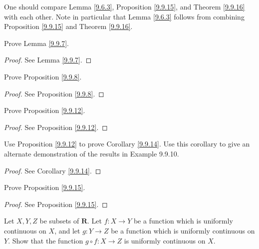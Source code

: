 \begin{remark}\label{9.9.17}
    One should compare Lemma \ref{9.6.3}, Proposition \ref{9.9.15}, and Theorem \ref{9.9.16} with each other.
    Note in particular that Lemma \ref{9.6.3} follows from combining Proposition \ref{9.9.15} and Theorem \ref{9.9.16}.
\end{remark}

\exercisesection

\begin{exercise}\label{ex 9.9.1}
    Prove Lemma \ref{9.9.7}.
\end{exercise}

\begin{proof}
    See Lemma \ref{9.9.7}.
\end{proof}

\begin{exercise}\label{ex 9.9.2}
    Prove Proposition \ref{9.9.8}.
\end{exercise}

\begin{proof}
    See Proposition \ref{9.9.8}.
\end{proof}

\begin{exercise}\label{ex 9.9.3}
    Prove Proposition \ref{9.9.12}.
\end{exercise}

\begin{proof}
    See Proposition \ref{9.9.12}.
\end{proof}

\begin{exercise}\label{ex 9.9.4}
    Use Proposition \ref{9.9.12} to prove Corollary \ref{9.9.14}.
    Use this corollary to give an alternate demonstration of the results in Example 9.9.10.
\end{exercise}

\begin{proof}
    See Corollary \ref{9.9.14}.
\end{proof}

\begin{exercise}\label{ex 9.9.5}
    Prove Proposition \ref{9.9.15}.
\end{exercise}

\begin{proof}
    See Proposition \ref{9.9.15}.
\end{proof}

\begin{exercise}\label{ex 9.9.6}
    Let \(X, Y, Z\) be subsets of \(\mathbf{R}\).
    Let \(f : X \to Y\) be a function which is uniformly continuous on \(X\), and let \(g : Y \to Z\) be a function which is uniformly continuous on \(Y\).
    Show that the function \(g \circ f : X \to Z\) is uniformly continuous on \(X\).
\end{exercise}

